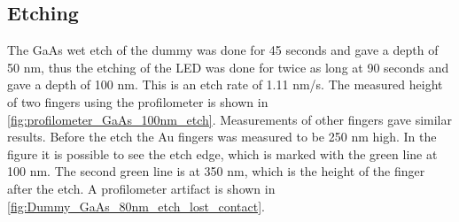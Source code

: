 








\subsection{Etching}

The GaAs wet etch of the dummy was done for 45 seconds and gave a depth of 50 nm, thus the etching of the LED was done for twice as long at 90 seconds and gave a depth of 100 nm.
This is an etch rate of 1.11 nm/s.
The measured height of two fingers using the profilometer is shown in \autoref{fig:profilometer_GaAs_100nm_etch}.
Measurements of other fingers gave similar results.
Before the etch the Au fingers was measured to be 250 nm high.
In the figure it is possible to see the etch edge, which is marked with the green line at 100 nm. 
The second green line is at 350 nm, which is the height of the finger after the etch.
A profilometer artifact is shown in \autoref{fig:Dummy_GaAs_80nm_etch_lost_contact}.



